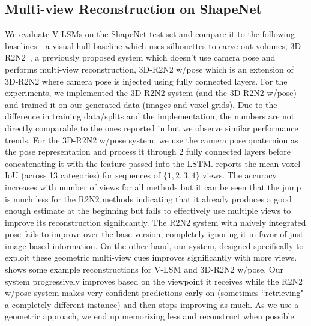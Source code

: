 \documentclass[../thesis.tex]{subfiles}
\begin{document}
\subsection{Multi-view Reconstruction on ShapeNet}
We evaluate V-LSMs on the ShapeNet test set and compare it to the following baselines - a visual hull baseline which uses silhouettes to carve out volumes, 3D-R2N2~\cite{choy20163d}, a previously proposed system which doesn't use camera pose and performs multi-view reconstruction, 3D-R2N2 w/pose which is an extension of 3D-R2N2 where camera pose is injected using fully connected layers. For the experiments, we implemented the 3D-R2N2 system (and the 3D-R2N2 w/pose) and trained it on our generated data (images and voxel grids). Due to the difference in training data/splits and the implementation, the numbers are not directly comparable to the ones reported in \cite{choy20163d} but we observe similar performance trends. For the 3D-R2N2 w/pose system, we use the camera pose quaternion as the pose representation and process it through 2 fully connected layers before concatenating it with the feature passed into the LSTM.
 reports the mean voxel IoU (across 13 categories) for sequences of $\{1, 2, 3, 4\}$ views. The accuracy increases with number of views for all methods but it can be seen that the jump is much less for the R2N2 methods indicating that it already produces a good enough estimate at the beginning but fails to effectively use multiple views to improve its reconstruction significantly. The R2N2 system with naively integrated pose fails to improve over the base version, completely ignoring it in favor of just image-based information. On the other hand, our system, designed specifically to exploit these geometric multi-view cues improves significantly with more views.  shows some example reconstructions for V-LSM and 3D-R2N2 w/pose. Our system progressively improves based on the viewpoint it receives while the R2N2 w/pose system makes very confident predictions early on (sometimes ``retrieving" a completely different instance) and then stops improving as much. As we use a geometric approach, we end up memorizing less and reconstruct when possible.
\end{document}
